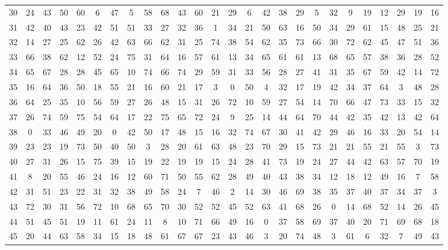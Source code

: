 \begin{table}
\begin{tabular}{c c c c c c c c c c c c c c c c c c c c c c c c c c }
30 & 24 & 43 & 50 & 60 & 6 & 47 & 5 & 58 & 68 & 43 & 60 & 21 & 29 & 6 & 42 & 38 & 29 & 5 & 32 & 9 & 19 & 12 & 29 & 19 & 16 \\
31 & 42 & 40 & 43 & 23 & 42 & 51 & 51 & 33 & 27 & 32 & 36 & 1 & 34 & 21 & 50 & 63 & 16 & 50 & 34 & 29 & 61 & 15 & 48 & 25 & 21 \\
32 & 14 & 27 & 25 & 62 & 26 & 42 & 63 & 66 & 62 & 31 & 25 & 74 & 38 & 54 & 62 & 35 & 73 & 66 & 30 & 72 & 62 & 45 & 47 & 51 & 36 \\
33 & 66 & 38 & 62 & 12 & 52 & 24 & 75 & 31 & 64 & 16 & 57 & 61 & 13 & 34 & 65 & 61 & 61 & 13 & 68 & 65 & 57 & 38 & 36 & 28 & 52 \\
34 & 65 & 67 & 28 & 28 & 45 & 65 & 10 & 74 & 66 & 74 & 29 & 59 & 31 & 33 & 56 & 28 & 27 & 41 & 31 & 35 & 67 & 59 & 42 & 14 & 72 \\
35 & 16 & 64 & 36 & 50 & 18 & 55 & 21 & 16 & 60 & 21 & 17 & 3 & 0 & 50 & 4 & 32 & 17 & 19 & 42 & 34 & 37 & 64 & 3 & 48 & 28 \\
36 & 64 & 25 & 35 & 10 & 56 & 59 & 27 & 26 & 48 & 15 & 31 & 26 & 72 & 10 & 59 & 27 & 54 & 14 & 70 & 66 & 47 & 73 & 33 & 15 & 32 \\
37 & 26 & 74 & 59 & 75 & 54 & 64 & 17 & 22 & 75 & 65 & 72 & 24 & 9 & 25 & 14 & 44 & 64 & 70 & 44 & 42 & 35 & 42 & 13 & 42 & 64 \\
38 & 0 & 33 & 46 & 49 & 20 & 0 & 42 & 50 & 17 & 48 & 15 & 16 & 32 & 74 & 67 & 30 & 41 & 42 & 29 & 46 & 16 & 33 & 20 & 54 & 14 \\
39 & 23 & 23 & 19 & 73 & 50 & 40 & 50 & 3 & 28 & 20 & 61 & 63 & 48 & 23 & 70 & 29 & 15 & 73 & 21 & 21 & 55 & 21 & 55 & 3 & 73 \\
40 & 27 & 31 & 26 & 15 & 75 & 39 & 15 & 19 & 22 & 19 & 19 & 15 & 24 & 28 & 41 & 73 & 19 & 24 & 27 & 44 & 42 & 63 & 57 & 70 & 19 \\
41 & 8 & 20 & 55 & 46 & 24 & 16 & 12 & 60 & 71 & 50 & 55 & 62 & 28 & 49 & 40 & 43 & 38 & 34 & 12 & 18 & 12 & 49 & 16 & 7 & 58 \\
42 & 31 & 51 & 23 & 22 & 31 & 32 & 38 & 49 & 58 & 24 & 7 & 46 & 2 & 14 & 30 & 46 & 69 & 38 & 35 & 37 & 40 & 37 & 34 & 37 & 3 \\
43 & 72 & 30 & 31 & 56 & 72 & 10 & 68 & 65 & 70 & 30 & 52 & 52 & 45 & 52 & 63 & 41 & 68 & 26 & 0 & 14 & 68 & 52 & 14 & 26 & 45 \\
44 & 51 & 45 & 51 & 19 & 11 & 61 & 24 & 11 & 8 & 10 & 71 & 66 & 49 & 16 & 0 & 37 & 58 & 69 & 37 & 40 & 20 & 71 & 69 & 68 & 18 \\
45 & 20 & 44 & 63 & 58 & 34 & 15 & 18 & 48 & 61 & 67 & 67 & 23 & 43 & 46 & 3 & 20 & 74 & 48 & 3 & 61 & 6 & 32 & 7 & 49 & 43 \\

\end{tabular}
\end{table}
